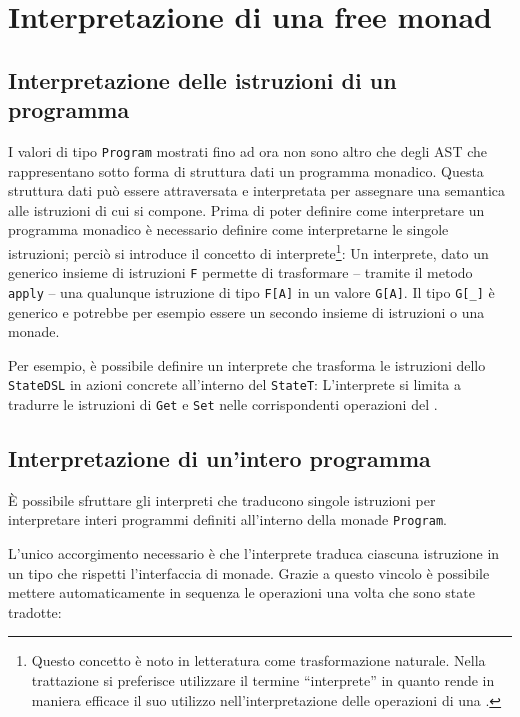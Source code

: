 \section{Interpretazione di una free monad}

\subsection{Interpretazione delle istruzioni di un programma}
I valori di tipo \lstinline{Program} mostrati fino ad ora non sono altro che degli AST che rappresentano sotto forma di struttura dati un programma monadico.
Questa struttura dati può essere attraversata e interpretata per assegnare una semantica alle istruzioni di cui si compone.
Prima di poter definire come interpretare un programma monadico è necessario definire come interpretarne le singole istruzioni; perciò si introduce il concetto di interprete\footnote{Questo concetto è noto in letteratura come trasformazione naturale\cite{cit:monad-transformers-and-modular-algebraic-effects}. Nella trattazione si preferisce utilizzare il termine ``interprete''  in quanto rende in maniera efficace il suo utilizzo nell'interpretazione delle operazioni di una .}:
Un interprete, dato un generico insieme di istruzioni \lstinline{F} permette di trasformare -- tramite il metodo \lstinline{apply} -- una qualunque istruzione di tipo \lstinline{F[A]} in un valore \lstinline{G[A]}. Il tipo \lstinline{G[_]} è generico e potrebbe per esempio essere un secondo insieme di istruzioni o una monade.

Per esempio, è possibile definire un interprete che trasforma le istruzioni dello \lstinline{StateDSL} in azioni concrete all'interno del  \lstinline{StateT}:
L'interprete si limita a tradurre le istruzioni di \lstinline{Get} e \lstinline{Set} nelle corrispondenti operazioni del .

\subsection{Interpretazione di un'intero programma}
È possibile sfruttare gli interpreti che traducono singole istruzioni per interpretare interi programmi definiti all'interno della monade \lstinline{Program}.

L'unico accorgimento necessario è che l'interprete traduca ciascuna istruzione in un tipo che rispetti l'interfaccia di monade. Grazie a questo vincolo è possibile mettere automaticamente in sequenza le operazioni una volta che sono state tradotte:

